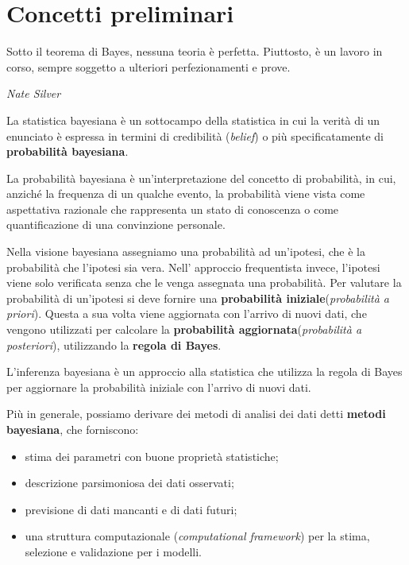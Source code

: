 \documentclass[../main.tex]{subfiles}
\begin{document}
\chapter{Concetti preliminari}
\epigraph{Sotto il teorema di Bayes, nessuna teoria è perfetta. Piuttosto, è un lavoro in corso, sempre soggetto a ulteriori perfezionamenti e prove.}{\textit{Nate Silver}}
\hfill \break
La statistica bayesiana è un sottocampo della statistica in cui la verità di un enunciato è espressa in termini di credibilità (\textit{belief})
o più specificatamente di \textbf{probabilità bayesiana}.
\begin{definition}
    \label{def:probabilita_bayesiana}
    La probabilità bayesiana è un'interpretazione del concetto di probabilità, in cui, anziché la frequenza di un qualche evento, la probabilità
    viene vista come aspettativa razionale che rappresenta un stato di conoscenza o come quantificazione di una convinzione personale.
\end{definition}
\hfill \break
Nella visione bayesiana assegniamo una probabilità ad un'ipotesi, che è la probabilità che l'ipotesi sia vera.
Nell' approccio frequentista invece, l'ipotesi viene solo verificata senza che le venga assegnata una probabilità.
Per valutare la probabilità di un'ipotesi si deve fornire una \textbf{probabilità iniziale}(\textit{probabilità a priori}).
Questa a sua volta viene aggiornata con l'arrivo di nuovi dati, che vengono utilizzati per calcolare la \textbf{probabilità aggiornata}(\textit{probabilità a posteriori}),
utilizzando la \textbf{regola di Bayes}.
\begin{definition}
    \label{def:inferenza_bayesiana}
    L'inferenza bayesiana è un approccio alla statistica che utilizza la regola di Bayes per aggiornare la probabilità iniziale con l'arrivo di nuovi dati.
\end{definition}
\hfill \break
Più in generale, possiamo derivare dei metodi di analisi dei dati detti \textbf{metodi bayesiana}, che forniscono:
\begin{itemize}
    \item stima dei parametri con buone proprietà statistiche;
    \item descrizione parsimoniosa dei dati osservati;
    \item previsione di dati mancanti e di dati futuri;
    \item una struttura computazionale (\textit{computational framework}) per la stima, selezione e validazione per i modelli.
\end{itemize}
\end{document}
